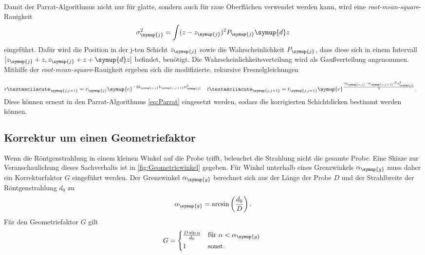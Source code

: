 Damit der Parrat-Algorithmus nicht nur für glatte, sondern auch für raue Oberflächen verwendet werden kann, wird eine \textit{root-mean-square}-Rauigkeit 
\begin{equation*}
    \sigma_{\symup{j}}^2 = \int (z-z_{\symup{j}})^2 P_{\symup{j}}\symup{d}z
\end{equation*}
eingeführt. Dafür wird die Position in der j-ten Schicht $z_{\symup{j}}$ sowie die Wahrscheinlichkeit $P_{\symup{j}}$, dass diese sich in einem Intervall 
$[z_{\symup{j}}+z, z_{\symup{j}}+z+\symup{d}z]$ befindet, benötigt. Die Wahrscheinlichkeitsverteilung wird als Gaußverteilung angenommen.
Mithilfe der \textit{root-mean-square}-Rauigkeit ergeben sich die modifizierte, rekursive Fresnelgleichungen

\begin{align}
    \label{eqn:r_korrigiert}
    r´_{\symup{j,j+1}} &= r_{\symup{j}}\symup{e}^{-2k_{\symup{z,j}}k_{\symup{z,j+1}}\sigma_{\symup{j}}^2} & t´_{\symup{j,j+1}} &= t_{\symup{j,j+1}}\symup{e}^{\frac{(k_{\symup{z,j}}-k_{\symup{z,j+1}})^2\sigma_{\symup{j}}^2}{2}}.
\end{align}
Diese können erneut in den Parrat-Algorithmus \autoref{eq:Parrat} eingesetzt werden, sodass die korrigierten Schichtdicken bestimmt werden können.

\subsection{Korrektur um einen Geometriefaktor}
Wenn die Röntgenstrahlung in einem kleinen Winkel auf die Probe trifft, beleuchet die Strahlung nicht die gesamte Probe. Eine Skizze zur Veranschaulichung dieses Sachverhalts ist in
\autoref{fig:Geometriewinkel} gegeben. Für Winkel unterhalb eines Grenzwinkels $\alpha_{\symup{g}}$ muss daher ein Korrekturfaktor $G$ eingeführt werden.
Der Grenzwinkel $\alpha_{\symup{g}}$ berechnet sich aus der Länge der Probe $D$ und der Strahlbreite der Röntgenstrahlung $d_0$ zu
\begin{equation}
    \label{eqn:a_g}
    \alpha_{\symup{g}} = \arcsin \left(\frac{d_0}{D}\right).
\end{equation}
Für den Geometriefaktor $G$ gilt
\begin{equation}
    G = 
    \begin{cases*}
        \frac{D\sin \alpha}{d_0}  & für $\alpha < \alpha_{\symup{g}}$ \\
        1 & sonst.
    \end{cases*}
    \label{eq:Geometriefaktor}
\end{equation}

